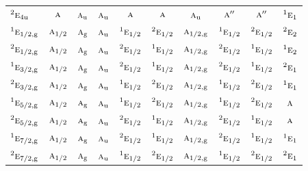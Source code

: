 \documentclass[10pt,a4paper]{article}
\numberwithin{equation}{section}
\newcommand{\irr}[1]{\text{\normalfont\scshape #1}}
\newcommand{\conjpair}[1]{{}^{#1}}
\newcommand{\ptag}[1]{\mathrm{#1}}
\begin{document}
{\begin{longtable}{@{}lccccccccc@{}}
$\conjpair{2}\irr{e}_{4\ptag{u}}$ & $\irr{a}$ & $\irr{a}_{\ptag{u}}$ & $\irr{a}_{\ptag{u}}$ & $\irr{a}$ & $\irr{a}$ & $\irr{a}_{\ptag{u}}$ & $\irr{a}''$ & $\irr{a}''$ & $\conjpair{1}\irr{e}_{1}$\\
$\conjpair{1}\irr{e}_{1/2,\ptag{g}}$ & $\irr{a}_{1/2}$ & $\irr{a}_{\ptag{g}}$ & $\irr{a}_{\ptag{u}}$ & $\conjpair{1}\irr{e}_{1/2}$ & $\conjpair{2}\irr{e}_{1/2}$ & $\irr{a}_{1/2,\ptag{g}}$ & $\conjpair{1}\irr{e}_{1/2}$ & $\conjpair{2}\irr{e}_{1/2}$ & $\conjpair{2}\irr{e}_{2}$\\
$\conjpair{2}\irr{e}_{1/2,\ptag{g}}$ & $\irr{a}_{1/2}$ & $\irr{a}_{\ptag{g}}$ & $\irr{a}_{\ptag{u}}$ & $\conjpair{2}\irr{e}_{1/2}$ & $\conjpair{1}\irr{e}_{1/2}$ & $\irr{a}_{1/2,\ptag{g}}$ & $\conjpair{2}\irr{e}_{1/2}$ & $\conjpair{1}\irr{e}_{1/2}$ & $\conjpair{1}\irr{e}_{2}$\\
$\conjpair{1}\irr{e}_{3/2,\ptag{g}}$ & $\irr{a}_{1/2}$ & $\irr{a}_{\ptag{g}}$ & $\irr{a}_{\ptag{u}}$ & $\conjpair{2}\irr{e}_{1/2}$ & $\conjpair{1}\irr{e}_{1/2}$ & $\irr{a}_{1/2,\ptag{g}}$ & $\conjpair{2}\irr{e}_{1/2}$ & $\conjpair{1}\irr{e}_{1/2}$ & $\conjpair{2}\irr{e}_{1}$\\
$\conjpair{2}\irr{e}_{3/2,\ptag{g}}$ & $\irr{a}_{1/2}$ & $\irr{a}_{\ptag{g}}$ & $\irr{a}_{\ptag{u}}$ & $\conjpair{1}\irr{e}_{1/2}$ & $\conjpair{2}\irr{e}_{1/2}$ & $\irr{a}_{1/2,\ptag{g}}$ & $\conjpair{1}\irr{e}_{1/2}$ & $\conjpair{2}\irr{e}_{1/2}$ & $\conjpair{1}\irr{e}_{1}$\\
$\conjpair{1}\irr{e}_{5/2,\ptag{g}}$ & $\irr{a}_{1/2}$ & $\irr{a}_{\ptag{g}}$ & $\irr{a}_{\ptag{u}}$ & $\conjpair{1}\irr{e}_{1/2}$ & $\conjpair{2}\irr{e}_{1/2}$ & $\irr{a}_{1/2,\ptag{g}}$ & $\conjpair{1}\irr{e}_{1/2}$ & $\conjpair{2}\irr{e}_{1/2}$ & $\irr{a}$\\
$\conjpair{2}\irr{e}_{5/2,\ptag{g}}$ & $\irr{a}_{1/2}$ & $\irr{a}_{\ptag{g}}$ & $\irr{a}_{\ptag{u}}$ & $\conjpair{2}\irr{e}_{1/2}$ & $\conjpair{1}\irr{e}_{1/2}$ & $\irr{a}_{1/2,\ptag{g}}$ & $\conjpair{2}\irr{e}_{1/2}$ & $\conjpair{1}\irr{e}_{1/2}$ & $\irr{a}$\\
$\conjpair{1}\irr{e}_{7/2,\ptag{g}}$ & $\irr{a}_{1/2}$ & $\irr{a}_{\ptag{g}}$ & $\irr{a}_{\ptag{u}}$ & $\conjpair{2}\irr{e}_{1/2}$ & $\conjpair{1}\irr{e}_{1/2}$ & $\irr{a}_{1/2,\ptag{g}}$ & $\conjpair{2}\irr{e}_{1/2}$ & $\conjpair{1}\irr{e}_{1/2}$ & $\conjpair{1}\irr{e}_{1}$\\
$\conjpair{2}\irr{e}_{7/2,\ptag{g}}$ & $\irr{a}_{1/2}$ & $\irr{a}_{\ptag{g}}$ & $\irr{a}_{\ptag{u}}$ & $\conjpair{1}\irr{e}_{1/2}$ & $\conjpair{2}\irr{e}_{1/2}$ & $\irr{a}_{1/2,\ptag{g}}$ & $\conjpair{1}\irr{e}_{1/2}$ & $\conjpair{2}\irr{e}_{1/2}$ & $\conjpair{2}\irr{e}_{1}$\\

\end{longtable}}
\end{document}
